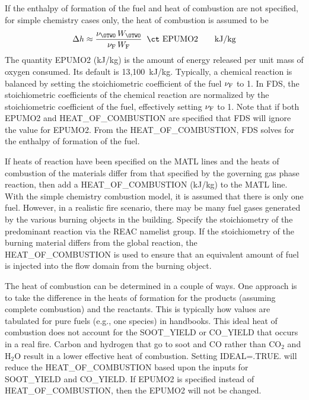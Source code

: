 \documentclass[11pt]{book}
\begin{document}
If the enthalpy of formation of the fuel and heat of combustion are not specified, for simple chemistry cases only, the heat of combustion is assumed to be
\begin{equation}
\Delta h \approx \frac{\nu_{\OTWO} \, W_{\OTWO} } { \nu_{\rm F} \, W_{\rm F} } \; \; \hbox{\ct EPUMO2}  \quad \quad \hbox{kJ/kg}
\label{EPUMO2}
\end{equation}
The quantity {\ct EPUMO2} (kJ/kg) is the amount of energy released per unit mass of oxygen consumed.
Its default is 13,100~kJ/kg. Typically, a chemical reaction is balanced by setting
the stoichiometric coefficient of the fuel $\nu_{\rm F}$ to 1. In FDS, the stoichiometric coefficients of
the chemical reaction are normalized by the  stoichiometric coefficient of the fuel, effectively setting $\nu_{\rm F}$ to 1.
Note that if both {\ct EPUMO2} and {\ct HEAT\_OF\_COMBUSTION} are specified that FDS will ignore
the value for {\ct EPUMO2}. From the {\ct HEAT\_OF\_COMBUSTION}, FDS solves for the enthalpy of formation of the fuel.

If heats of reaction have been specified on the
{\ct MATL} lines and
the heats of combustion of the materials differ from that specified by
the governing gas phase reaction, then add a
{\ct HEAT\_OF\_COMBUSTION} (kJ/kg) to the {\ct MATL} line.
With the simple chemistry combustion
model, it is assumed that there is only one fuel. However, in a realistic
fire scenario, there may be many fuel gases generated by the various
burning objects in the building. Specify
the stoichiometry of the predominant reaction via the {\ct REAC}
namelist group. If the stoichiometry of the burning material
differs from the global reaction, the {\ct HEAT\_OF\_COMBUSTION} is
used to ensure that an equivalent amount of fuel is injected into the
flow domain from the burning object.

The heat of combustion can be determined in a couple of ways.
One approach is to take the difference in the heats of formation for the products (assuming complete combustion) and the reactants.
This is typically how values are tabulated for pure fuels (e.g., one species) in handbooks.
This ideal heat of combustion does not account for the  {\ct SOOT\_YIELD} or  {\ct CO\_YIELD} that occurs in a real fire.
Carbon and hydrogen that go to soot and CO rather than CO$_2$ and H$_2$O result in a lower effective heat of combustion.
Setting {\ct IDEAL=.TRUE.} will reduce the {\ct HEAT\_OF\_COMBUSTION} based upon the inputs for {\ct SOOT\_YIELD} and {\ct CO\_YIELD}.
If {\ct EPUMO2} is specified instead of {\ct HEAT\_OF\_COMBUSTION}, then the {\ct EPUMO2} will not be changed.
\end{document}

